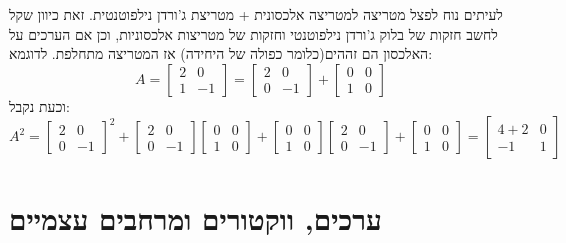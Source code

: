 \documentclass{tstextbook}
\begin{document}
\begin{remark}
לעיתים נוח לפצל מטריצה למטריצה אלכסונית + מטריצת ג'ורדן נילפוטנטית. זאת כיוון שקל לחשב חזקות של בלוק ג'ורדן נילפוטנטי וחזקות של מטריצות אלכסוניות, וכן אם הערכים על האלכסון הם זההים(כלומר כפולה של היחידה) אז המטריצה מתחלפת. לדוגמא:
$$A=\begin{bmatrix}2 & 0 \\1 & -1\end{bmatrix}=\begin{bmatrix}2 & 0 \\0 & -1\end{bmatrix}+\begin{bmatrix}0 & 0 \\1 & 0
\end{bmatrix}$$
וכעת נקבל:
$$A^{2}=\begin{bmatrix}2 & 0 \\0 & -1 \end{bmatrix}^{2}+\begin{bmatrix}2 & 0 \\0 & -1\end{bmatrix}\begin{bmatrix}0 & 0 \\1 & 0\end{bmatrix}+\begin{bmatrix}0 & 0 \\1 & 0\end{bmatrix}\begin{bmatrix}2 & 0 \\0 & -1\end{bmatrix}+\begin{bmatrix}0 & 0 \\1 & 0\end{bmatrix}=\begin{bmatrix}4+2 & 0 \\-1 & 1
\end{bmatrix}$$

\end{remark}

\section{ערכים, ווקטורים ומרחבים עצמיים}
\end{document}

